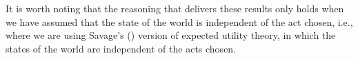 \documentclass[a4paper]{article}
\newcommand\D{\mathcal{D}}
\newcommand{\todoinfo}[2][]{\todo[backgroundcolor=orange!80,bordercolor=black,linecolor=gray!80, #1,inline,caption={}]{#2}}
\newenvironment{CCM rewritten}
{\begingroup\color{blue}} %
{\endgroup}              %
\begin{document}
It is worth noting that the reasoning that delivers these results only holds when we have assumed that the state of the world is independent of the act chosen, i.e., where we are using Savage's (\citeyear{savage1954fs}) version of expected utility theory, in which the states of the world are independent of the acts chosen. %


\end{document}
